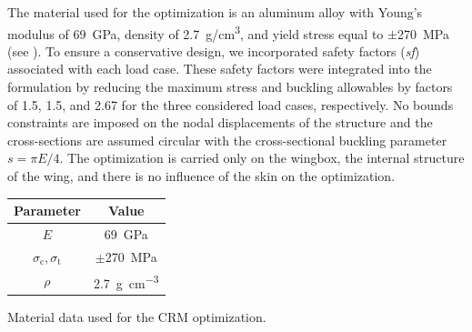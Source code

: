 The material used for the optimization is an aluminum alloy with Young's modulus of \qty{69}{\GPa}, density of \qty{2.7}{\gram/\cm^3}, and yield stress equal to $\pm$\qty{270}{\MPa} (see ). To ensure a conservative design, we incorporated safety factors (\textit{sf}) associated with each load case. These safety factors were integrated into the formulation by reducing the maximum stress and buckling allowables by factors of 1.5, 1.5, and 2.67 for the three considered load cases, respectively. No bounds constraints are imposed on the nodal displacements of the structure and the cross-sections are assumed circular with the cross-sectional buckling parameter $s = \pi E/4$. The optimization is carried only on the wingbox, the internal structure of the wing, and there is no influence of the skin on the optimization.
\begin{margintable}
    \small
    \centering
    \begin{tabular}{cc}
    \toprule
    \textbf{Parameter}        & \textbf{Value} \\ \midrule
    $E$              & \qty{69}{GPa}     \\
    $\sigma_\text{c}, \sigma_\text{t}$ & $\pm $\qty{270}{MPa} \\
    $\rho$              & \qty{2.7}{\gram\per\cubic\centi\metre}   \\
    \bottomrule
    \end{tabular}
    \caption{Material data used for the CRM optimization.}
    \label{tab:07_CRM_mat}
\end{margintable}

